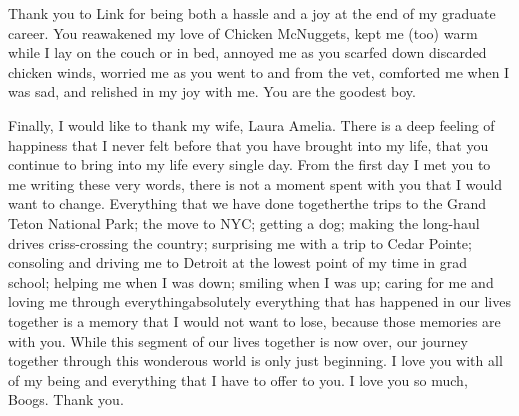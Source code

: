 \begin{acknowledge}
Thank you to Link for being both a hassle and a joy at the end of my
graduate career. You reawakened my love of Chicken McNuggets, kept me
(too) warm while I lay on the couch or in bed, annoyed me as you scarfed
down discarded chicken winds, worried me as you went to and from the
vet, comforted me when I was sad, and relished in my joy with me. You
are the goodest boy.

Finally, I would like to thank my wife, Laura Amelia. There is a deep
feeling of happiness that I never felt before that you have brought into
my life, that you continue to bring into my life every single day. From
the first day I met you to me writing these very words, there is not a
moment spent with you that I would want to change. Everything that we have
done together\textemdash{}the trips to the Grand Teton National Park; the
move to NYC; getting a dog; making the long-haul drives criss-crossing
the country; surprising me with a trip to Cedar Pointe; consoling and driving
me to Detroit at the lowest point of my time in grad school; helping me
when I was down; smiling when I was up; caring for me and loving me
through everything\textemdash{}absolutely everything that has happened
in our lives together is a memory that I would not want to lose, because
those memories are with you. While this segment of our lives together is
now over, our journey together through this wonderous world is only just
beginning. I love you with all of my being and everything that I have to
offer to you. I love you so much, Boogs. Thank you.

\end{acknowledge}
